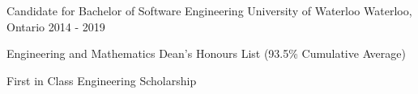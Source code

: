\begin{cventries}
  \cventry
    {Candidate for Bachelor of Software Engineering}
    {University of Waterloo}
    {Waterloo, Ontario}
    {2014 - 2019}
    {
      \begin{cvitems}
      \item Engineering and Mathematics Dean’s Honours List (93.5\% Cumulative Average)
      \item First in Class Engineering Scholarship
      \end{cvitems}
    }
\end{cventries}
